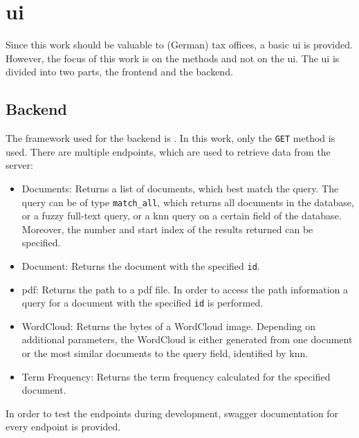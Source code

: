 \section{\acl{ui}}\label{sec:ui}

Since this work should be valuable to (German) tax offices, a basic \ac{ui} is provided.
However, the focus of this work is on the methods and not on the \ac{ui}.
The \ac{ui} is divided into two parts, the frontend and the backend.

\subsection{Backend}\label{subsec:backend}

The framework used for the backend is \flask{}.
In this work, only the \texttt{GET} method is used.
There are multiple endpoints, which are used to retrieve data from the server:

\begin{itemize}
    \item \label{pt:docs}Documents: 
        Returns a list of documents, which best match the query.
        The query can be of type \texttt{match\_all}, which returns all documents in the database, 
        or a fuzzy full-text query, 
        or a \ac{knn} query on a certain field of the database.
        Moreover, the number and start index of the results returned can be specified.

    \item \label{pt:doc}Document: 
        Returns the document with the specified \texttt{id}.

    \item \label{pt:pdf}\ac{pdf}: 
        Returns the path to a \ac{pdf} file.
        In order to access the path information a query for a document with the specified \texttt{id} is performed.
    
    \item \label{pt:wordcloud}WordCloud: 
        Returns the bytes of a WordCloud image. 
        Depending on additional parameters, the WordCloud is either generated from one document or 
        the most similar documents to the query field, identified by \ac{knn}.

    \item \label{pt:termfrequency}Term Frequency:
        Returns the term frequency calculated for the specified document.
\end{itemize}

In order to test the endpoints during development, swagger documentation for every endpoint is provided.





